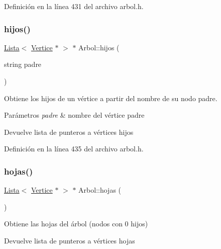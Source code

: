 Definición en la línea 431 del archivo arbol.\+h.

\mbox{\label{classArbol_ac799e737e25e07d285d2bb29ba950b5c}} 
\subsubsection{\texorpdfstring{hijos()}{hijos()}\hspace{0.1cm}{\footnotesize\ttfamily [2/2]}}
{\footnotesize\ttfamily \hyperlink{classLista}{Lista}$<$ \hyperlink{classVertice}{Vertice} $\ast$ $>$ $\ast$ Arbol\+::hijos (\begin{DoxyParamCaption}\item[{string}]{padre }\end{DoxyParamCaption})}



Obtiene los hijos de un vértice a partir del nombre de su nodo padre. 


\begin{DoxyParams}{Parámetros}
{\em padre} & nombre del vértice padre \\
\hline
\end{DoxyParams}
\begin{DoxyReturn}{Devuelve}
lista de punteros a vértices hijos 
\end{DoxyReturn}


Definición en la línea 435 del archivo arbol.\+h.

\mbox{\label{classArbol_a54203315682d5c39015ae7d871223b66}} 
\subsubsection{\texorpdfstring{hojas()}{hojas()}}
{\footnotesize\ttfamily \hyperlink{classLista}{Lista}$<$ \hyperlink{classVertice}{Vertice} $\ast$ $>$ $\ast$ Arbol\+::hojas (\begin{DoxyParamCaption}{ }\end{DoxyParamCaption})}



Obtiene las hojas del árbol (nodos con 0 hijos) 

\begin{DoxyReturn}{Devuelve}
lista de punteros a vértices hojas 
\end{DoxyReturn}


